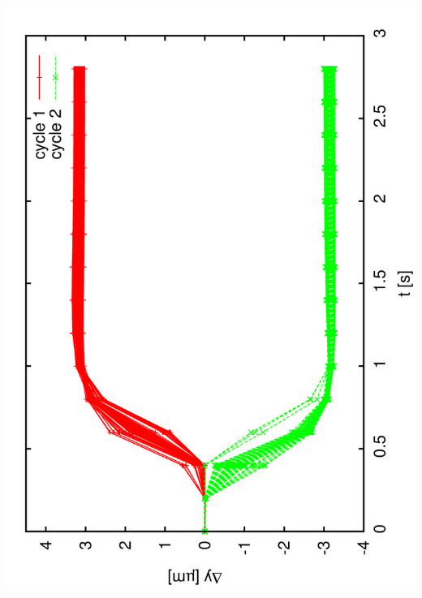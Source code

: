 \documentclass[a4paper,11pt]{book}
\begin{document}
 \includegraphics[angle=-90,scale=0.16]{image24.pdf}
\end{document}
